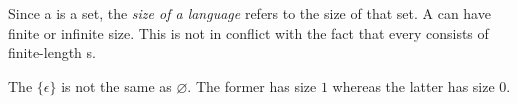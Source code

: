 \begin{note} \label{note:Size-of-a-language}
Since a  is a set, the \emph{size of a language} refers to the size of that set. 
A  can have finite or infinite size. 
This is not in conflict with the fact that every  consists of finite-length s. 
\end{note}


\begin{note} \label{note:varnothing-vs-epsilon}
The  $\{\epsilon\}$ is not the same  as $\varnothing$. 
The former has size $1$ whereas the latter has size $0$. 
\end{note}


